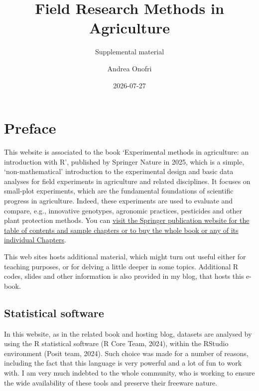 \documentclass[
  letterpaper,
  DIV=11,
  numbers=noendperiod]{scrreprt}
\title{Field Research Methods in Agriculture}
\subtitle{Supplemental material}
\author{Andrea Onofri}
\date{2026-07-27}
\renewcommand*\contentsname{Table of contents}
\newcommand\contentsname{Table of contents}
\begin{document}
\maketitle

\renewcommand*\contentsname{Table of contents}
{
\setcounter{tocdepth}{2}
\tableofcontents
}


\chapter*{Preface}\label{preface}


This website is associated to the book `Experimental methods in
agriculture: an introduction with R', published by Springer Nature in
2025, which is a simple, `non-mathematical' introduction to the
experimental design and basic data analyses for field experiments in
agriculture and related disciplines. It focuses on small-plot
experiments, which are the fundamental foundations of scientific
progress in agriculture. Indeed, these experiments are used to evaluate
and compare, e.g., innovative genotypes, agronomic practices, pesticides
and other plant protection methods. You can
\href{https://link.springer.com/book/10.1007/978-3-032-08199-5}{visit
the Springer publication website for the table of contents and sample
chapters or to buy the whole book or any of its individual Chapters}.

This web sites hosts additional material, which might turn out useful
either for teaching purposes, or for delving a little deeper in some
topics. Additional R codes, slides and other information is also
provided in my blog, that hosts this e-book.

\section*{Statistical software}\label{statistical-software}


In this website, as in the related book and hosting blog, datasets are
analysed by using the R statistical software (R Core Team, 2024), within
the RStudio environment (Posit team, 2024). Such choice was made for a
number of reasons, including the fact that this language is very
powerful and a lot of fun to work with. I am very much indebted to the
whole community, who is working to ensure the wide availability of these
tools and preserve their freeware nature.
\end{document}
